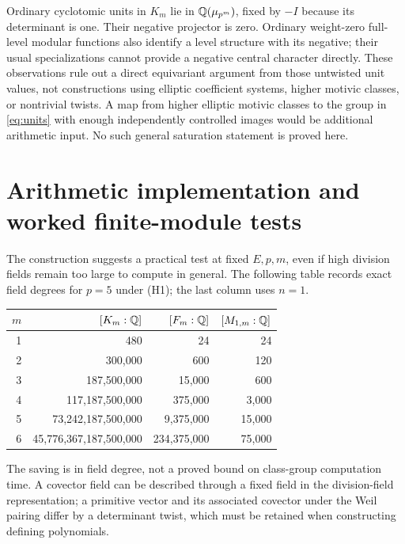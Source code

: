 \documentclass[11pt,a4paper]{article}
\theoremstyle{definition}\newtheorem{definition}[theorem]{Definition}
\theoremstyle{remark}\newtheorem{remark}[theorem]{Remark}
\numberwithin{equation}{section}
\begin{document}
Ordinary cyclotomic units in $K_m$ lie in $\mathbb Q(\mu_{p^m})$, fixed by $-I$ because its determinant is one. Their negative projector is zero. Ordinary weight-zero full-level modular functions also identify a level structure with its negative; their usual specializations cannot provide a negative central character directly. These observations rule out a direct equivariant argument from those untwisted unit values, not constructions using elliptic coefficient systems, higher motivic classes, or nontrivial twists. A map from higher elliptic motivic classes to the group in \eqref{eq:units} with enough independently controlled images would be additional arithmetic input. No such general saturation statement is proved here.


\section{Arithmetic implementation and worked finite-module tests}
The construction suggests a practical test at fixed $E,p,m$, even if high division fields remain too large to compute in general. The following table records exact field degrees for $p=5$ under (H1); the last column uses $n=1$.
\begin{center}\small
\begin{tabular}{@{}rrrr@{}}
\toprule
$m$&$[K_m:\mathbb Q]$&$[F_m:\mathbb Q]$&$[M_{1,m}:\mathbb Q]$\\\midrule
1&480&24&24\\
2&300,000&600&120\\
3&187,500,000&15,000&600\\
4&117,187,500,000&375,000&3,000\\
5&73,242,187,500,000&9,375,000&15,000\\
6&45,776,367,187,500,000&234,375,000&75,000\\\bottomrule
\end{tabular}
\end{center}
The saving is in field degree, not a proved bound on class-group computation time. A covector field can be described through a fixed field in the division-field representation; a primitive vector and its associated covector under the Weil pairing differ by a determinant twist, which must be retained when constructing defining polynomials.
\end{document}

